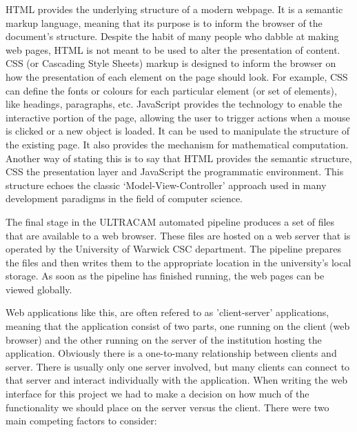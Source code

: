 HTML provides the underlying structure of a modern webpage. It is a semantic markup language, meaning that its purpose is to inform the browser of the document's structure. Despite the habit of many people who dabble at making web pages, HTML is not meant to be used to alter the presentation of content. CSS (or Cascading Style Sheets) markup is designed to inform the browser on how the presentation of each element on the page should look. For example, CSS can define the fonts or colours for each particular element (or set of elements), like headings, paragraphs, etc. JavaScript provides the technology to enable the interactive portion of the page, allowing the user to trigger actions when a mouse is clicked or a new object is loaded. It can be used to manipulate the structure of the existing page. It also provides the mechanism for mathematical computation. Another way of stating this is to say that HTML provides the semantic structure, CSS the presentation layer and JavaScript the programmatic environment. This structure echoes the classic `Model-View-Controller' approach used in many development paradigms in the field of computer science.

The final stage in the ULTRACAM automated pipeline produces a set of files that are available to a web browser. These files are hosted on a web server that is operated by the University of Warwick CSC department. The pipeline prepares the files and then writes them to the appropriate location in the university's local storage. As soon as the pipeline has finished running, the web pages can be viewed globally. 

\label{sect:clientserver}
Web applications like this, are often refered to as 'client-server' applications, meaning that the application consist of two parts, one running on the client (web browser) and the other running on the server of the institution hosting the application. Obviously there is a one-to-many relationship between clients and server. There is usually only one server involved, but many clients can connect to that server and interact individually with the application. When writing the web interface for this project we had to make a decision on how much of the functionality we should place on the server versus the client. There were two main competing factors to consider:

